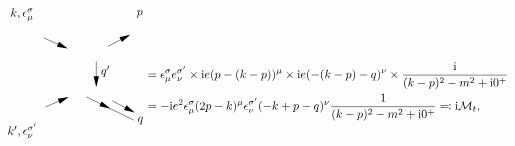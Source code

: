 \begin{equation}
\begin{gathered}
\begin{tikzpicture}[x=0.75pt,y=0.75pt,yscale=-1,xscale=1]
            \draw    (275,206.67) -- (222,180.67) ;
            \draw [shift={(248.5,193.67)}, rotate = 206.13] [fill={rgb, 255:red, 0; green, 0; blue, 0 }  ][line width=0.08]  [draw opacity=0] (12,-3) -- (0,0) -- (12,3) -- cycle    ;
            \draw    (174,114.67) -- (199.17,125.85) ;
            \draw [shift={(201,126.67)}, rotate = 203.96] [fill={rgb, 255:red, 0; green, 0; blue, 0 }  ][line width=0.08]  [draw opacity=0] (12,-3) -- (0,0) -- (12,3) -- cycle    ;
            \draw    (176,192) -- (200.17,181.47) ;
            \draw [shift={(202,180.67)}, rotate = 156.45] [fill={rgb, 255:red, 0; green, 0; blue, 0 }  ][line width=0.08]  [draw opacity=0] (12,-3) -- (0,0) -- (12,3) -- cycle    ;
            \draw    (269.23,112.09) -- (246,124.17) ;
            \draw [shift={(271,111.17)}, rotate = 152.53] [fill={rgb, 255:red, 0; green, 0; blue, 0 }  ][line width=0.08]  [draw opacity=0] (12,-3) -- (0,0) -- (12,3) -- cycle    ;
            \draw    (274.23,197.24) -- (251,185.17) ;
            \draw [shift={(276,198.17)}, rotate = 207.47] [fill={rgb, 255:red, 0; green, 0; blue, 0 }  ][line width=0.08]  [draw opacity=0] (12,-3) -- (0,0) -- (12,3) -- cycle    ;
            \draw    (233,141) -- (233,167.67) ;
            \draw [shift={(233,169.67)}, rotate = 270] [fill={rgb, 255:red, 0; green, 0; blue, 0 }  ][line width=0.08]  [draw opacity=0] (12,-3) -- (0,0) -- (12,3) -- cycle    ;
            
            \draw (277,93.27) node [anchor=south west] [inner sep=0.75pt]    {$p$};
            \draw (278,201.57) node [anchor=north west][inner sep=0.75pt]    {$q$};
            \draw (237,144.4) node [anchor=north west][inner sep=0.75pt]    {$q'$};
            \draw (164,97.27) node [anchor=south east] [inner sep=0.75pt]    {$k,\epsilon _{\mu }^{\sigma }$};
            \draw (168,209.07) node [anchor=north east] [inner sep=0.75pt]    {$k',\epsilon _{\nu }^{\sigma '}$};
            \end{tikzpicture}            
    \end{gathered} 
    \begin{aligned}[t]
        &= \epsilon^\sigma_\mu e^{\sigma'}_\nu \times \ii e (p - (k - p))^\mu \times \ii e (- (k - p) - q)^\nu \times \frac{\ii}{(k - p)^2 - m^2 + \ii 0^+} \\
        &= - \ii e^2 \epsilon^\sigma_\mu (2 p - k)^\mu \epsilon^{\sigma'}_\nu (-k+p-q)^\nu \frac{1}{(k-p)^2 - m^2 + \ii 0^+} \eqqcolon \ii \mathcal{M}_t,
    \end{aligned}
\end{equation}